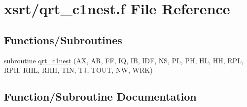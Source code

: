 \hypertarget{qrt__c1nest_8f}{}\section{xsrt/qrt\+\_\+c1nest.f File Reference}
\label{qrt__c1nest_8f}
\subsection*{Functions/\+Subroutines}
\begin{DoxyCompactItemize}
\item 
subroutine \hyperlink{qrt__c1nest_8f_a55f17483d5b7a06a19c2158dafcea8ef}{qrt\+\_\+c1nest} (AX, AR, FF, IQ, IB, I\+DF, NS, PL, PH, HL, HH, R\+PL, R\+PH, R\+HL, R\+HH, T\+IN, TJ, T\+O\+UT, NW, W\+RK)
\end{DoxyCompactItemize}


\subsection{Function/\+Subroutine Documentation}
\mbox{\label{qrt__c1nest_8f_a55f17483d5b7a06a19c2158dafcea8ef}} 
